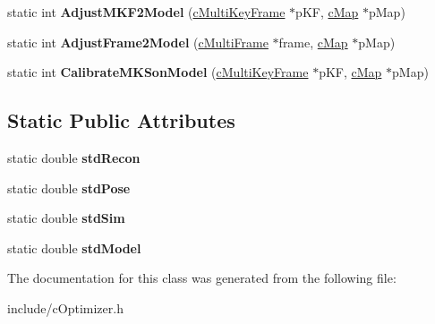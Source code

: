 \begin{DoxyCompactItemize}
\item 
static int {\bfseries Adjust\+M\+K\+F2\+Model} (\hyperlink{classMultiColSLAM_1_1cMultiKeyFrame}{c\+Multi\+Key\+Frame} $\ast$p\+KF, \hyperlink{classMultiColSLAM_1_1cMap}{c\+Map} $\ast$p\+Map)\hypertarget{classMultiColSLAM_1_1cOptimizer_ac5d007defc2e4a8114c17b9db077baf0}{}\label{classMultiColSLAM_1_1cOptimizer_ac5d007defc2e4a8114c17b9db077baf0}

\item 
static int {\bfseries Adjust\+Frame2\+Model} (\hyperlink{classMultiColSLAM_1_1cMultiFrame}{c\+Multi\+Frame} $\ast$frame, \hyperlink{classMultiColSLAM_1_1cMap}{c\+Map} $\ast$p\+Map)\hypertarget{classMultiColSLAM_1_1cOptimizer_ab633c7578a569114014a77959b1371e5}{}\label{classMultiColSLAM_1_1cOptimizer_ab633c7578a569114014a77959b1371e5}

\item 
static int {\bfseries Calibrate\+M\+K\+Son\+Model} (\hyperlink{classMultiColSLAM_1_1cMultiKeyFrame}{c\+Multi\+Key\+Frame} $\ast$p\+KF, \hyperlink{classMultiColSLAM_1_1cMap}{c\+Map} $\ast$p\+Map)\hypertarget{classMultiColSLAM_1_1cOptimizer_ae5e63dcfbdacfae44d69c13227c51d08}{}\label{classMultiColSLAM_1_1cOptimizer_ae5e63dcfbdacfae44d69c13227c51d08}

\end{DoxyCompactItemize}
\subsection*{Static Public Attributes}
\begin{DoxyCompactItemize}
\item 
static double {\bfseries std\+Recon}\hypertarget{classMultiColSLAM_1_1cOptimizer_afbd9d530896f4784a62dbe5035785172}{}\label{classMultiColSLAM_1_1cOptimizer_afbd9d530896f4784a62dbe5035785172}

\item 
static double {\bfseries std\+Pose}\hypertarget{classMultiColSLAM_1_1cOptimizer_af021f8dbb3d87728c3a0df8252f260cf}{}\label{classMultiColSLAM_1_1cOptimizer_af021f8dbb3d87728c3a0df8252f260cf}

\item 
static double {\bfseries std\+Sim}\hypertarget{classMultiColSLAM_1_1cOptimizer_a62e456f086574eb7feaff4d3ad510caf}{}\label{classMultiColSLAM_1_1cOptimizer_a62e456f086574eb7feaff4d3ad510caf}

\item 
static double {\bfseries std\+Model}\hypertarget{classMultiColSLAM_1_1cOptimizer_ae897a55d0f0f9703077d67276cb50af0}{}\label{classMultiColSLAM_1_1cOptimizer_ae897a55d0f0f9703077d67276cb50af0}

\end{DoxyCompactItemize}


The documentation for this class was generated from the following file\+:\begin{DoxyCompactItemize}
\item 
include/c\+Optimizer.\+h\end{DoxyCompactItemize}
